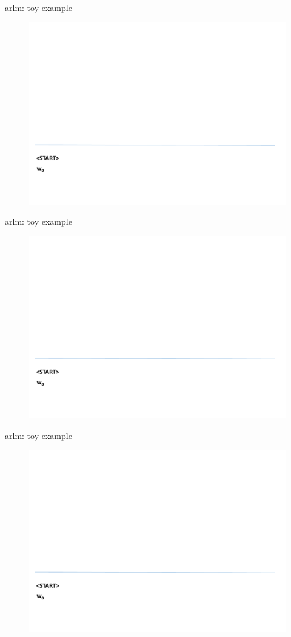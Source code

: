 \begin{frame}{arlm: toy example}
	\vfill
	\begin{figure}
		\centering
		\includegraphics[width=12cm,page=1]{figure/arlm.pdf}
	\end{figure}
	\vfill
\end{frame}
\begin{frame}[noframenumbering]{arlm: toy example}
	\vfill
	\begin{figure}
		\centering
		\includegraphics[width=12cm,page=2]{figure/arlm.pdf}
	\end{figure}
	\vfill
\end{frame}
\begin{frame}[noframenumbering]{arlm: toy example}
	\vfill
	\begin{figure}
		\centering
		\includegraphics[width=12cm,page=3]{figure/arlm.pdf}
	\end{figure}
	\vfill
\end{frame}

